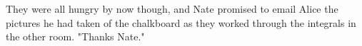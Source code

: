 They were all hungry by now though, and Nate promised to email Alice the pictures he had taken of the chalkboard as they worked through the integrals in the other room. "Thanks Nate."

\mymark

%



